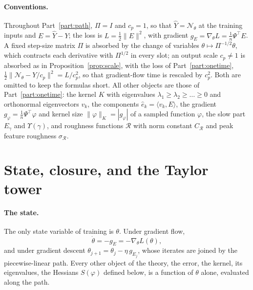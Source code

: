 \documentclass[11pt]{article}
\theoremstyle{definition}
\theoremstyle{remark}
\newcommand{\Net}{\mathcal{N}_\theta}    %
\newcommand{\Rgh}{\mathcal{R}}           %
\newcommand{\sR}{\sigma_{\Rgh}}
\newcommand{\CR}{C_{\Rgh}}
\newcommand{\ip}[2]{\langle #1,#2\rangle}
\begin{document}
\paragraph{Conventions.}
Throughout Part~\ref{part:path}, $\Pi = I$ and $c_p = 1$, so that $\hat Y = \Net$ at the training inputs and $E = \hat Y - Y$; the loss is $L = \frac12\|E\|^2$, with gradient $g_E = \nabla_\theta L = \frac1n\Psi^\top E$.
A fixed step-size matrix $\Pi$ is absorbed by the change of variables $\theta\mapsto\Pi^{-1/2}\theta$, which contracts each derivative with $\Pi^{1/2}$ in every slot; an output scale $c_p\neq1$ is absorbed as in Proposition~\ref{prop:scale}, with the loss of Part~\ref{part:onetime}, $\frac12\|\Net - Y/c_p\|^2 = L/c_p^2$, so that gradient-flow time is rescaled by $c_p^2$.
Both are omitted to keep the formulas short.
All other objects are those of Part~\ref{part:onetime}: the kernel $K$ with eigenvalues $\lambda_1\ge\lambda_2\ge\dots\ge0$ and orthonormal eigenvectors $v_k$, the components $\hat e_k = \ip{v_k}{E}$, the gradient $g_\varphi = \frac1n\Psi^\top\varphi$ and kernel size $\|\varphi\|_K = |g_\varphi|$ of a sampled function $\varphi$, the slow part $E_\gamma$ and $\Upsilon(\gamma)$, and roughness functions $\Rgh$ with norm constant $\CR$ and peak feature roughness $\sR$.

\section{State, closure, and the Taylor tower}\label{sec:state}

\paragraph{The state.}
The only state variable of training is $\theta$.
Under gradient flow,
\begin{equation}\label{eq:gf}
\dot\theta = -g_E = -\nabla_\theta L(\theta),
\end{equation}
and under gradient descent $\theta_{j+1} = \theta_j - \eta\,g_{E_j}$, whose iterates are joined by the piecewise-linear path.
Every other object of the theory, the error, the kernel, its eigenvalues, the Hessians $S(\varphi)$ defined below, is a function of $\theta$ alone, evaluated along the path.
\end{document}
